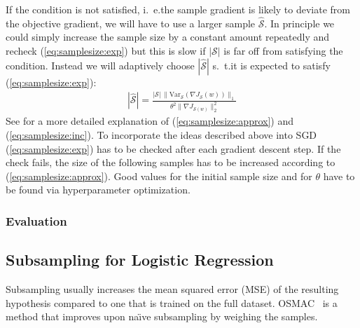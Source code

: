 If the condition is not satisfied, i.~e.\@ the sample gradient is likely to deviate from the objective gradient, we will have to use a larger sample \(\widehat{\mathcal{S}}\).
In principle we could simply increase the sample size by a constant amount repeatedly and recheck (\ref{eq:samplesize:exp}) but this is slow if \(|\mathcal{S}|\) is far off from satisfying the condition.
Instead we will adaptively choose \(|\widehat{\mathcal{S}}|\) s.~t.\@ it is expected to satisfy (\ref{eq:samplesize:exp}):
\begin{align}
	|\widehat{\mathcal{S}}| = \frac{|\mathcal{S}|\, \|\mathrm{Var}_{\mathcal{S}}(\nabla J_{\mathcal{S}}(w))\|_1}{\theta^2 \|\nabla J_{\mathcal{S}(w)}\|_2^2}\label{eq:samplesize:inc}
\end{align}
See \citet[Chapter 3]{Byrd2012} for a more detailed explanation of (\ref{eq:samplesize:approx}) and (\ref{eq:samplesize:inc}).
To incorporate the ideas described above into SGD (\ref{eq:samplesize:exp}) has to be checked after each gradient descent step.
If the check fails, the size of the following samples has to be increased according to (\ref{eq:samplesize:approx}).
Good values for the initial sample size and for \(\theta\) have to be found via hyperparameter optimization.

\subsubsection{Evaluation}%
\label{sec:params:samplesize:eval}


\subsection{Subsampling for Logistic Regression}%
\label{sec:params:osmac}

Subsampling usually increases the mean squared error (MSE) of the resulting hypothesis compared to one that is trained on the full dataset.
OSMAC~\cite{Wang2017} is a method that improves upon na{\"\i}ve subsampling by weighing the samples.

